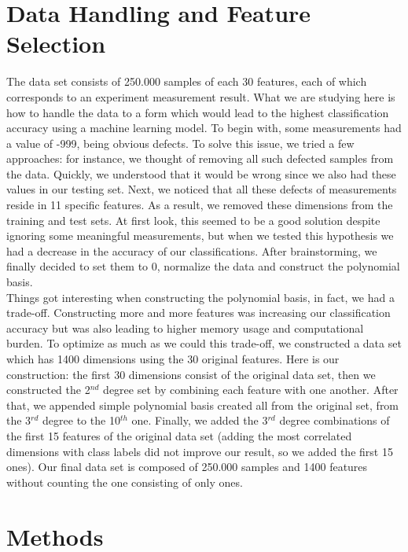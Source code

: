 \documentclass[journal]{IEEEtran}
\begin{document}
\section{Data Handling and Feature Selection}
The data set consists of 250.000 samples of each 30 features, each of which corresponds to an experiment measurement result. What we are studying here is how to handle the data to a form which would lead to the highest classification accuracy using a machine learning model. To begin with, some measurements had a value of -999, being obvious defects. To solve this issue, we tried a few approaches: for instance, we thought of removing all such defected samples from the data. Quickly, we understood that it would be wrong since we also had these values in our testing set. Next, we noticed that all these defects of measurements reside in 11 specific features. As a result, we removed these dimensions from the training and test sets. At first look, this seemed to be a good solution despite ignoring some meaningful measurements, but when we tested this hypothesis we had a decrease in the accuracy of our classifications. After brainstorming, we finally decided to set them to 0, normalize the data and construct the polynomial basis. \\Things got interesting when constructing the polynomial basis, in fact, we had a trade-off. Constructing more and more features was increasing our classification accuracy but was also leading to higher memory usage and computational burden. To optimize as much as we could this trade-off, we constructed a data set which has 1400 dimensions using the 30 original features. Here is our construction: the first 30 dimensions consist of the original data set, then we constructed the 2$^{nd}$ degree set by combining each feature with one another. After that, we appended simple polynomial basis created all from the original set, from the 3$^{rd}$ degree to the 10$^{th}$ one. Finally, we added the 3$^{rd}$ degree combinations of the first 15 features of the original data set (adding the most correlated dimensions with class labels did not improve our result, so we added the first 15 ones). Our final data set is composed of 250.000 samples and 1400 features without counting the one consisting of only ones.

\section{Methods}
\end{document}
